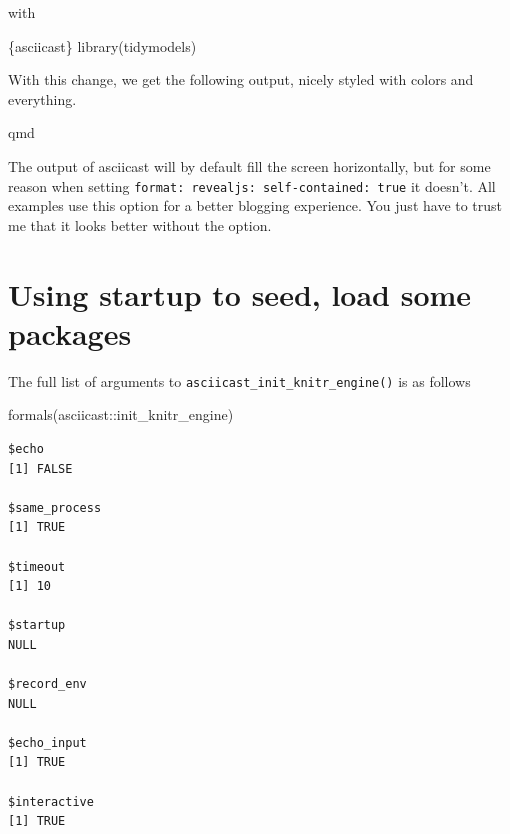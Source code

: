 \documentclass[
  letterpaper,
  DIV=11,
  numbers=noendperiod]{scrreprt}
\newenvironment{Shaded}{\begin{snugshade}}{\end{snugshade}}
\newcommand{\FunctionTok}[1]{\textcolor[rgb]{0.28,0.35,0.67}{#1}}
\newcommand{\InformationTok}[1]{\textcolor[rgb]{0.37,0.37,0.37}{#1}}
\newcommand{\NormalTok}[1]{\textcolor[rgb]{0.00,0.23,0.31}{#1}}
\newcommand{\SpecialCharTok}[1]{\textcolor[rgb]{0.37,0.37,0.37}{#1}}
\begin{document}
with

\begin{Shaded}
\begin{Highlighting}[]
\InformationTok{\textasciigrave{}\textasciigrave{}\textasciigrave{}\{asciicast\}}
\InformationTok{library(tidymodels)}
\InformationTok{\textasciigrave{}\textasciigrave{}\textasciigrave{}}
\end{Highlighting}
\end{Shaded}

With this change, we get the following output, nicely styled with colors
and everything.

qmd

\begin{tcolorbox}[enhanced jigsaw, titlerule=0mm, bottomrule=.15mm, opacityback=0, colbacktitle=quarto-callout-note-color!10!white, colframe=quarto-callout-note-color-frame, coltitle=black, breakable, toprule=.15mm, colback=white, bottomtitle=1mm, title=\textcolor{quarto-callout-note-color}{\faInfo}\hspace{0.5em}{Note}, toptitle=1mm, arc=.35mm, left=2mm, leftrule=.75mm, rightrule=.15mm, opacitybacktitle=0.6]

The output of asciicast will by default fill the screen horizontally,
but for some reason when setting
\texttt{format:\ revealjs:\ self-contained:\ true} it doesn't. All
examples use this option for a better blogging experience. You just have
to trust me that it looks better without the option.

\end{tcolorbox}

\section{Using startup to seed, load some
packages}\label{using-startup-to-seed-load-some-packages}

The full list of arguments to \texttt{asciicast\_init\_knitr\_engine()}
is as follows

\begin{Shaded}
\begin{Highlighting}[]
\FunctionTok{formals}\NormalTok{(asciicast}\SpecialCharTok{::}\NormalTok{init\_knitr\_engine)}
\end{Highlighting}
\end{Shaded}

\begin{verbatim}
$echo
[1] FALSE

$same_process
[1] TRUE

$timeout
[1] 10

$startup
NULL

$record_env
NULL

$echo_input
[1] TRUE

$interactive
[1] TRUE
\end{verbatim}
\end{document}
